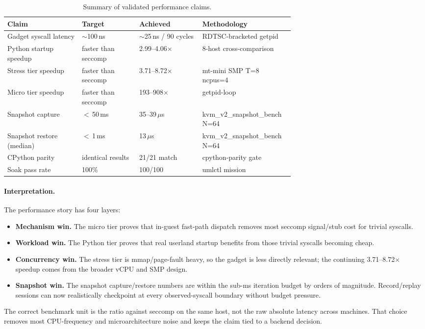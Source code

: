 \begin{table}[htbp]
\centering
\caption{Summary of validated performance claims.}
\label{tab:bench-summary}
\begin{tabularx}{\linewidth}{@{}p{0.26\linewidth}p{0.20\linewidth}p{0.22\linewidth}Y@{}}
\toprule
Claim & Target & Achieved & Methodology \\
\midrule
Gadget syscall latency     & $\sim$100\,ns         & $\sim$25\,ns / 90 cycles    & RDTSC-bracketed getpid \\
Python startup speedup     & faster than seccomp    & 2.99--4.06$\times$          & 8-host cross-comparison \\
Stress tier speedup        & faster than seccomp    & 3.71--8.72$\times$          & mt-mini SMP T=8 ncpus=4 \\
Micro tier speedup         & faster than seccomp    & 193--908$\times$            & getpid-loop \\
Snapshot capture           & $<$\,50\,ms            & 35--39\,$\mu$s              & kvm\_v2\_snapshot\_bench N=64 \\
Snapshot restore (median)  & $<$\,1\,ms             & 13\,$\mu$s                  & kvm\_v2\_snapshot\_bench N=64 \\
CPython parity             & identical results      & 21/21 match                 & cpython-parity gate \\
Soak pass rate             & 100\%                  & 100/100                     & umlctl mission \\
\bottomrule
\end{tabularx}
\end{table}

\paragraph{Interpretation.}
The performance story has four layers:
\begin{itemize}[leftmargin=2em]
  \item \textbf{Mechanism win.}  The micro tier proves that in-guest
    fast-path dispatch removes most seccomp signal/stub cost for
    trivial syscalls.
  \item \textbf{Workload win.}  The Python tier proves that real
    userland startup benefits from those trivial syscalls becoming
    cheap.
  \item \textbf{Concurrency win.}  The stress tier is mmap/page-fault
    heavy, so the gadget is less directly relevant; the continuing
    3.71--8.72$\times$ speedup comes from the broader vCPU and SMP
    design.
  \item \textbf{Snapshot win.}  The snapshot capture/restore numbers
    are within the sub-ms iteration budget by orders of magnitude.
    Record/replay sessions can now realistically checkpoint at every
    observed-syscall boundary without budget pressure.
\end{itemize}

\noindent
The correct benchmark unit is the ratio against seccomp on the same
host, not the raw absolute latency across machines.  That choice
removes most CPU-frequency and microarchitecture noise and keeps the
claim tied to a backend decision.
